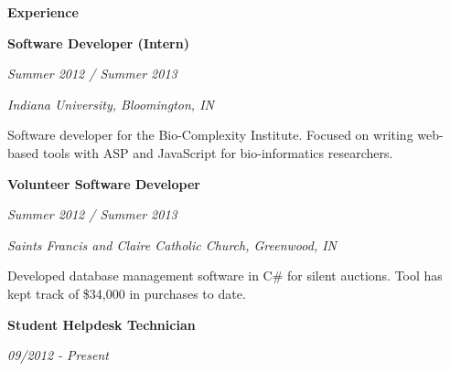 \documentclass[11pt]{article}
\begin{document}
	\begin{flushleft}
		\textbf{Experience}
		\hrulefill
	\end{flushleft}

	\begin{center}
	\begin{minipage}{0.95\linewidth}
		\begin{minipage}{0.5\linewidth}
			\begin{flushleft}
				\textbf{Software Developer (Intern)}
			\end{flushleft}
		\end{minipage}
		\hfill
		\begin{minipage}{0.5\linewidth}
			\begin{flushright}
				\textit{Summer 2012 / Summer 2013}
			\end{flushright}
		\end{minipage}

		\textit{Indiana University, Bloomington, IN}

		Software developer for the Bio-Complexity Institute. Focused on writing web-based tools with ASP and JavaScript for bio-informatics researchers. 
	\end{minipage}

	\vspace{5mm}

	\begin{minipage}{0.95\linewidth}
		\begin{minipage}{0.5\linewidth}
			\begin{flushleft}
				\textbf{Volunteer Software Developer}
			\end{flushleft}
		\end{minipage}
		\hfill
		\begin{minipage}{0.5\linewidth}
			\begin{flushright}
				\textit{Summer 2012 / Summer 2013}
			\end{flushright}
		\end{minipage}

		\textit{Saints Francis and Claire Catholic Church, Greenwood, IN}

		Developed database management software in C\# for silent auctions. Tool has kept track of \$34,000 in purchases to date.
	\end{minipage}

	\vspace{5mm}

	\begin{minipage}{0.95\linewidth}
		\begin{minipage}{0.5\linewidth}
			\begin{flushleft}
				\textbf{Student Helpdesk Technician}
			\end{flushleft}
		\end{minipage}
		\hfill
		\begin{minipage}{0.5\linewidth}
			\begin{flushright}
				\textit{09/2012 - Present}
			\end{flushright}
		\end{minipage}


\end{minipage}
\end{center}
\end{document}
